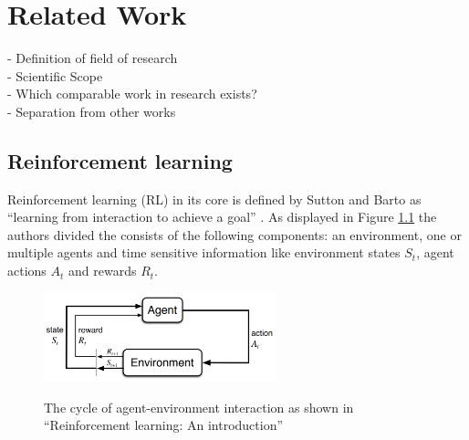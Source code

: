 %
%
\chapter{Related Work}\label{sec:RelatedWork}
- Definition of field of research \\
- Scientific Scope \\
- Which comparable work in research exists? \\
- Separation from other works

\section{Reinforcement learning}
Reinforcement learning (RL) in its core is defined by Sutton and Barto as ``learning from 
interaction to achieve a goal'' \cite{suba18}. As displayed in Figure \ref{fig:rl_cycle}
the authors divided the  consists of the following components: an environment,
one or multiple agents and time sensitive information like environment states $S_{t}$,
agent actions $A_{t}$ and rewards $R_{t}$.
\begin{figure}[hpbt]
    \centering
    \includegraphics[width=0.6\textwidth]{pictures/RLInteractionSB}\\
    \caption[reinforcement learning cycle]{The cycle of agent-environment interaction as shown in ``Reinforcement learning: An introduction''\cite{suba18}}\label{fig:rl_cycle}
\end{figure}

